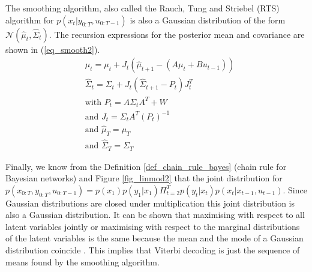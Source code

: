 The smoothing algorithm, also called the Rauch, Tung and Striebel (RTS) algorithm for $p(x_t|y_{0:T},u_{0:T-1})$ is also a Gaussian distribution of the form $\mathcal{N}(\hat{\mu}_t, \hat{\Sigma}_t)$. The recursion expressions for the posterior mean and covariance are shown in (\ref{eq_smooth2}).
\begin{equation}
\begin{aligned}
&\hat{\mu}_t = \mu_t + J_t\left(\hat{\mu}_{t+1}-(A\mu_t+Bu_{t-1})\right) \\
&\hat{\Sigma}_t = \Sigma_t + J_t(\hat{\Sigma}_{t+1}-P_t)J^T_t \\
&\text{with } P_t = A\Sigma_tA^T + W \\
&\text{and } J_t = \Sigma_t A^T (P_t)^{-1}\\
&\text{and } \hat{\mu}_T = \mu_T\\
&\text{and } \hat{\Sigma}_T = \Sigma_T
\end{aligned}
\label{eq_smooth2}
\end{equation}

Finally, we know from the Definition \ref{def_chain_rule_bayes} (chain rule for Bayesian networks) and Figure \ref{fig_linmod2} that the joint distribution for $p(x_{0:T},y_{0:T}, u_{0:T-1}) = p(x_1)p(y_1|x_1)\Pi^T_{t=2} p(y_t|x_t)p(x_{t}|x_{t-1},u_{t-1})$. Since Gaussian distributions are closed under multiplication this joint distribution is also a Gaussian distribution. It can be shown that maximising with respect to all latent variables jointly or maximising with respect to the marginal distributions of the latent variables is the same because the mean and the mode of a Gaussian distribution coincide \cite{barber}. This implies that Viterbi decoding is just the sequence of means found by the smoothing algorithm.

